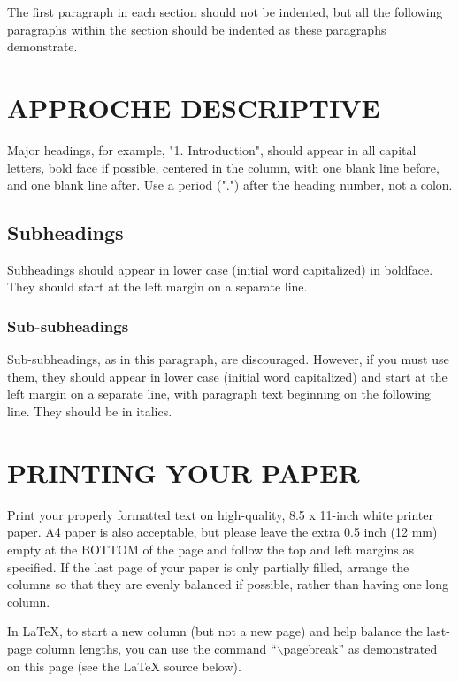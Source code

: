 \documentclass{article}
\begin{document}
The first paragraph in each section should not be indented, but all the
following paragraphs within the section should be indented as these paragraphs
demonstrate.

\section{APPROCHE DESCRIPTIVE}
\label{sec:desc}

Major headings, for example, "1. Introduction", should appear in all capital
letters, bold face if possible, centered in the column, with one blank line
before, and one blank line after. Use a period (".") after the heading number,
not a colon.

\subsection{Subheadings}
\label{ssec:subhead}

Subheadings should appear in lower case (initial word capitalized) in
boldface.  They should start at the left margin on a separate line.
 
\subsubsection{Sub-subheadings}
\label{sssec:subsubhead}

Sub-subheadings, as in this paragraph, are discouraged. However, if you
must use them, they should appear in lower case (initial word
capitalized) and start at the left margin on a separate line, with paragraph
text beginning on the following line.  They should be in italics.

\section{PRINTING YOUR PAPER}
\label{sec:print}

Print your properly formatted text on high-quality, 8.5 x 11-inch white printer
paper. A4 paper is also acceptable, but please leave the extra 0.5 inch (12 mm)
empty at the BOTTOM of the page and follow the top and left margins as
specified.  If the last page of your paper is only partially filled, arrange
the columns so that they are evenly balanced if possible, rather than having
one long column.

In LaTeX, to start a new column (but not a new page) and help balance the
last-page column lengths, you can use the command ``$\backslash$pagebreak'' as
demonstrated on this page (see the LaTeX source below).
\end{document}
